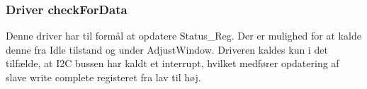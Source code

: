 \subsubsection{Driver checkForData}
Denne driver har til formål at opdatere Status\_Reg. Der er mulighed for at kalde denne fra Idle tilstand og under AdjustWindow.
Driveren kaldes kun i det tilfælde, at I2C bussen har kaldt et interrupt, hvilket medfører opdatering af slave write complete registeret fra lav til høj.

\clearpage